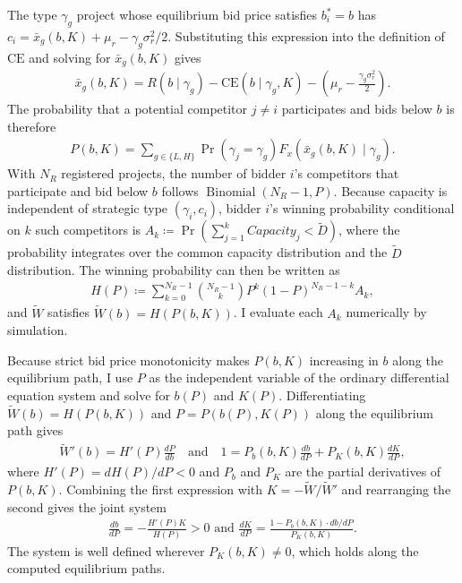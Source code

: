 \documentclass[12pt]{article}
\theoremstyle{definition} %
\begin{document}
The type $\gamma_g$ project whose equilibrium bid price satisfies $b_i^\ast=b$ has $c_i=\bar{x}_g(b,K)+\mu_r-\gamma_g\sigma_r^2/2$. Substituting this expression into the definition of $\mathrm{CE}$ and solving for $\bar{x}_g(b,K)$ gives
\begin{align*}
\bar{x}_g(b,K)
=R(b\mid\gamma_g)-\mathrm{CE}(b\mid\gamma_g,K)
-\left(\mu_r-\frac{\gamma_g\sigma_r^2}{2}\right).
\end{align*}
The probability that a potential competitor $j \neq i$ participates and bids below $b$ is therefore
\begin{align}
\label{eq:appx_cf_lower_bid_probability}
P(b,K)=\sum_{g\in\{L,H\}}\Pr(\gamma_j=\gamma_g)F_x(\bar{x}_g(b,K)\mid\gamma_g).
\end{align}
With $N_R$ registered projects, the number of bidder $i$'s competitors that participate and bid below $b$ follows $\operatorname{Binomial}(N_R-1,P)$. Because capacity is independent of strategic type $(\gamma_i,c_i)$, bidder $i$'s winning probability conditional on $k$ such competitors is $A_k\coloneqq\Pr(\sum_{j=1}^k Capacity_j<\widetilde D)$, where the probability integrates over the common capacity distribution and the $\widetilde D$ distribution. The winning probability can then be written as
\begin{align}
\label{eq:appx_cf_winning_probability}
H(P)
\coloneqq\sum_{k=0}^{N_R-1}\binom{N_R-1}{k}
P^k(1-P)^{N_R-1-k}A_k,
\end{align}
and $\widetilde W$ satisfies $\widetilde W(b)=H(P(b,K))$. I evaluate each $A_k$ numerically by simulation.

Because strict bid price monotonicity makes $P(b,K)$ increasing in $b$ along the equilibrium path, I use $P$ as the independent variable of the ordinary differential equation system and solve for $b(P)$ and $K(P)$. Differentiating $\widetilde W(b)=H(P(b,K))$ and $P=P(b(P),K(P))$ along the equilibrium path gives
\begin{align*}
\widetilde W'(b)=H'(P)\frac{dP}{db}
\quad\text{and}\quad
1=P_b(b,K)\frac{db}{dP}+P_K(b,K)\frac{dK}{dP},
\end{align*}
where $H'(P)=dH(P)/dP<0$ and $P_b$ and $P_K$ are the partial derivatives of $P(b,K)$. Combining the first expression with $K=-\widetilde W/\widetilde W'$ and rearranging the second gives the joint system
\begin{align}
\label{eq:appx_cf_joint_ode}
\frac{db}{dP}
=-\frac{H'(P)K}{H(P)}>0
\text{ and }
\frac{dK}{dP}
=\frac{1-P_b(b,K) \cdot db/dP}{P_K(b,K)}.
\end{align}
The system is well defined wherever $P_K(b,K)\neq0$, which holds along the computed equilibrium paths.
\end{document}
